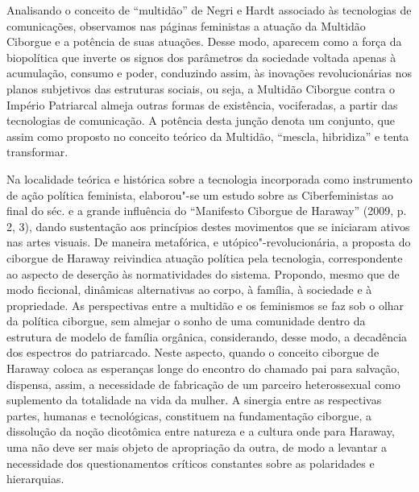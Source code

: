 Analisando o conceito de ``multidão'' de Negri e Hardt associado às
tecnologias de comunicações, observamos nas páginas feministas a atuação
da Multidão Ciborgue e a potência de suas atuações. Desse modo, aparecem
como a força da biopolítica que inverte os signos dos parâmetros da
sociedade voltada apenas à acumulação, consumo e poder, conduzindo
assim, às inovações revolucionárias nos planos subjetivos das estruturas
sociais, ou seja, a Multidão Ciborgue contra o Império Patriarcal almeja
outras formas de existência, vociferadas, a partir das tecnologias de
comunicação. A potência desta junção denota um conjunto, que assim como
proposto no conceito teórico da Multidão, ``mescla, hibridiza'' e tenta
transformar.

Na localidade teórica e histórica sobre a tecnologia incorporada como
instrumento de ação política feminista, elaborou"-se um estudo sobre as
Ciberfeministas ao final do séc.  e a grande influência do ``Manifesto
Ciborgue de Haraway'' (2009, p. 2, 3), dando sustentação aos princípios
destes movimentos que se iniciaram ativos nas artes visuais. De maneira
metafórica, e utópico"-revolucionária, a proposta do ciborgue de Haraway
reivindica atuação política pela tecnologia, correspondente ao aspecto
de deserção às normatividades do sistema. Propondo, mesmo que de modo
ficcional, dinâmicas alternativas ao corpo, à família, à sociedade e à
propriedade. As perspectivas entre a multidão e os feminismos se faz sob
o olhar da política ciborgue, sem almejar o sonho de uma comunidade
dentro da estrutura de modelo de família orgânica, considerando, desse
modo, a decadência dos espectros do patriarcado. Neste aspecto, quando o
conceito ciborgue de Haraway coloca as esperanças longe do encontro do
chamado pai para salvação, dispensa, assim, a necessidade de fabricação
de um parceiro heterossexual como suplemento da totalidade na vida da
mulher. A sinergia entre as respectivas partes, humanas e tecnológicas,
constituem na fundamentação ciborgue, a dissolução da noção dicotômica
entre natureza e a cultura onde para Haraway, uma não deve ser mais
objeto de apropriação da outra, de modo a levantar a necessidade dos
questionamentos críticos constantes sobre as polaridades e hierarquias.

